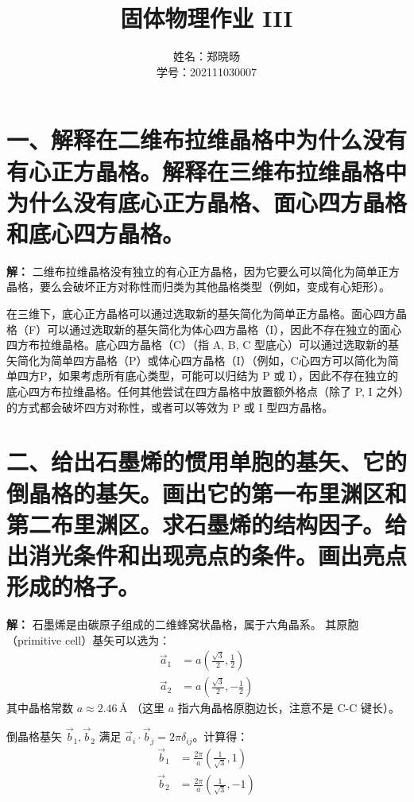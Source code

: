 \documentclass{ctexart}
\title{固体物理作业 III}
\author{姓名：郑晓旸 \\ 学号：202111030007} %
\date{} %
\begin{document}
\maketitle %

\section*{一、解释在二维布拉维晶格中为什么没有有心正方晶格。解释在三维布拉维晶格中为什么没有底心正方晶格、面心四方晶格和底心四方晶格。}

\textbf{解：}
二维布拉维晶格没有独立的有心正方晶格，因为它要么可以简化为简单正方晶格，要么会破坏正方对称性而归类为其他晶格类型（例如，变成有心矩形）。

在三维下，底心正方晶格可以通过选取新的基矢简化为简单正方晶格。面心四方晶格（F）可以通过选取新的基矢简化为体心四方晶格（I），因此不存在独立的面心四方布拉维晶格。底心四方晶格（C）（指 A, B, C 型底心）可以通过选取新的基矢简化为简单四方晶格（P）或体心四方晶格（I）（例如，C心四方可以简化为简单四方P，如果考虑所有底心类型，可能可以归结为 P 或 I），因此不存在独立的底心四方布拉维晶格。任何其他尝试在四方晶格中放置额外格点（除了 P, I 之外）的方式都会破坏四方对称性，或者可以等效为 P 或 I 型四方晶格。

\section*{二、给出石墨烯的惯用单胞的基矢、它的倒晶格的基矢。画出它的第一布里渊区和第二布里渊区。求石墨烯的结构因子。给出消光条件和出现亮点的条件。画出亮点形成的格子。}

\textbf{解：}
石墨烯是由碳原子组成的二维蜂窝状晶格，属于六角晶系。
其原胞（primitive cell）基矢可以选为：
\begin{align*}
  \vec{a}_1 &= a \left( \frac{\sqrt{3}}{2}, \frac{1}{2} \right) \\
  \vec{a}_2 &= a \left( \frac{\sqrt{3}}{2}, -\frac{1}{2} \right)
\end{align*}
其中晶格常数 $a \approx 2.46 \, \text{Å}$ （这里 $a$ 指六角晶格原胞边长，注意不是 C-C 键长）。

倒晶格基矢 $\vec{b}_1, \vec{b}_2$ 满足 $\vec{a}_i \cdot \vec{b}_j = 2\pi \delta_{ij}$。计算得：
\begin{align*}
  \vec{b}_1 &= \frac{2\pi}{a} \left( \frac{1}{\sqrt{3}}, 1 \right) \\
  \vec{b}_2 &= \frac{2\pi}{a} \left( \frac{1}{\sqrt{3}}, -1 \right)
\end{align*}
\end{document}
